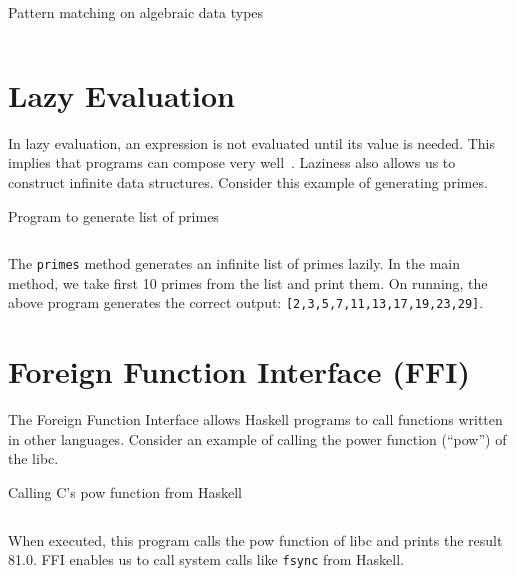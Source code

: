 \begin{program}
  \caption{Pattern matching on algebraic data types}
  \label{prog:shapes}
  \inputminted{haskell}{hs/shapes.hs}
\end{program}

\section{Lazy Evaluation}
In lazy evaluation, an expression is not evaluated until its value is needed. This implies that programs can compose very well~\cite{hughes1989functional}. Laziness also allows us to construct infinite data structures. Consider this example of generating primes.

\begin{program}
  \caption{Program to generate list of primes}
  \label{prog:list-of-primes}
  \inputminted{haskell}{hs/primes.hs}
\end{program}

The \texttt{primes} method generates an infinite list of primes lazily. In the main method, we take first 10 primes from the list and print them. On running, the above program generates the correct output: \texttt{[2,3,5,7,11,13,17,19,23,29]}.

\section{Foreign Function Interface (FFI)}
The Foreign Function Interface allows Haskell programs to call functions written in other languages. Consider an example of calling the power function (``pow'') of the libc.

\begin{program}
  \caption{Calling C's pow function from Haskell}
  \label{prog:c-pow}
  \inputminted{haskell}{hs/pow.hs}
\end{program}

When executed, this program calls the pow function of libc and prints the result 81.0.
FFI enables us to call system calls like \texttt{fsync} from Haskell.
